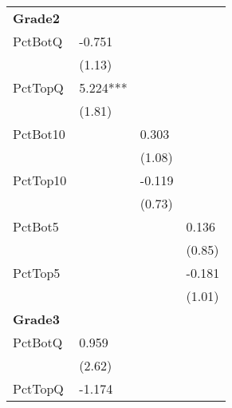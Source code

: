 \begin{table}[htb]
\begin{threeparttable}
\begin{tabular}{l l l l}
      \hline
      \textbf{Grade2}   &                               &                               &                              \\
      PctBotQ  & -0.751                        &                               &                              \\
               & (1.13)                        &                               &                              \\
      PctTopQ  & 5.224***                      &                               &                              \\
               & (1.81)                        &                               &                              \\
      PctBot10 &                               & 0.303                         &                              \\
               &                               & (1.08)                        &                              \\
      PctTop10 &                               & -0.119                        &                              \\
               &                               & (0.73)                        &                              \\
      PctBot5  &                               &                               & 0.136                        \\
               &                               &                               & (0.85)                       \\
      PctTop5  &                               &                               & -0.181                       \\
               &                               &                               & (1.01)                       \\
      \hline
      \textbf{Grade3}   &                               &                               &                              \\
      PctBotQ  & 0.959                         &                               &                              \\
               & (2.62)                        &                               &                              \\
      PctTopQ  & -1.174                        &                               &                              \\

\end{tabular}
\end{threeparttable}
\end{table}
